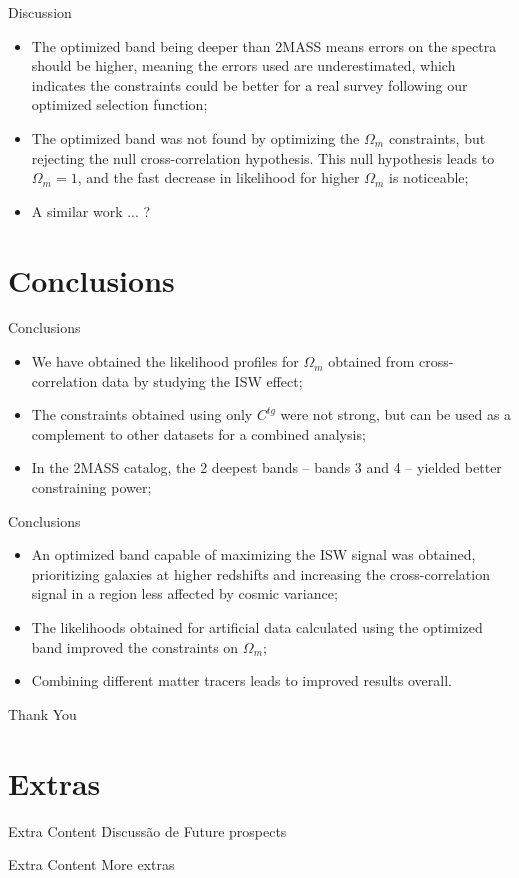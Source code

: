 \documentclass[serif, aspectratio=169]{beamer}
\begin{document}
\begin{frame}{Discussion}
    \begin{itemize}
        \item The optimized band being deeper than 2MASS means errors on the spectra should be higher, meaning the errors used are underestimated, which indicates the constraints could be better for a real survey following our optimized selection function;
        \item The optimized band was not found by optimizing the $\Omega_m$ constraints, but rejecting the null cross-correlation hypothesis. This null hypothesis leads to $\Omega_m=1$, and the fast decrease in likelihood for higher $\Omega_m$ is noticeable;
        \item A similar work ... ?
    \end{itemize}
\end{frame}

\section{Conclusions}

\begin{frame}{Conclusions}
    \begin{itemize}
        \item We have obtained the likelihood profiles for $\Omega_m$ obtained from cross-correlation data by studying the ISW effect;
        \item The constraints obtained using only $C^{tg}$ were not strong, but can be used as a complement to other datasets for a combined analysis;
        \item In the 2MASS catalog, the 2 deepest bands -- bands 3 and 4 -- yielded better constraining power;
    \end{itemize}
\end{frame}
\begin{frame}{Conclusions}
    \begin{itemize}
        \item An optimized band capable of maximizing the ISW signal was obtained, prioritizing galaxies at higher redshifts and increasing the cross-correlation signal in a region less affected by cosmic variance;
        \item The likelihoods obtained for artificial data calculated using the optimized band improved the constraints on $\Omega_m$;
        \item Combining different matter tracers leads to improved results overall.
    \end{itemize}
\end{frame}

\begin{frame}
    \begin{center}
        {\Huge\calligra Thank You}
    \end{center}
\end{frame}

\section*{Extras}

\begin{frame}{Extra Content}
    Discussão de Future prospects
\end{frame}

\begin{frame}{Extra Content}
	More extras
\end{frame}
\end{document}

